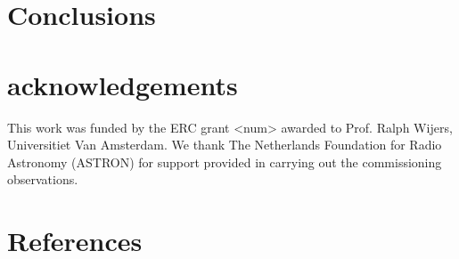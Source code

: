 \documentclass{ws-jai}
\begin{document}
\section {\label{sec:conclusion} Conclusions}

\section* {acknowledgements}

This work  was funded  by the ERC  grant <num> awarded  to Prof.   Ralph Wijers,
Universitiet  Van Amsterdam.   We  thank The  Netherlands  Foundation for  Radio
Astronomy  (ASTRON)  for support  provided  in  carrying out  the  commissioning
observations.

\section*{References}



\end{document}
